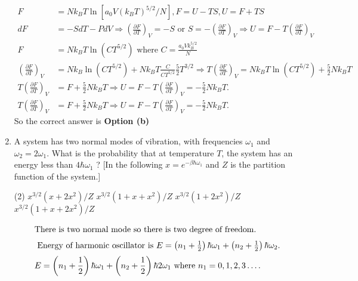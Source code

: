 \begin{enumerate}
\begin{answer}
	\begin{align*}
    F&=N k_{B} T \ln \left[a_{0} V\left(k_{B} T\right)^{5 / 2} / N\right], F=U-T S, U=F+T S\\
	d F&=-S d T-P d V \Rightarrow\left(\frac{\partial F}{\partial T}\right)_{V}=-S \text { or } S=-\left(\frac{\partial F}{\partial T}\right)_{V} \Rightarrow U=F-T\left(\frac{\partial F}{\partial T}\right)_{V} \\
	F&=N k_{B} T \ln \left(C T^{5 / 2}\right) \text { where } C=\frac{a_{0} V k_{B}^{5 / 2}}{N} \\
	\left(\frac{\partial F}{\partial T}\right)_{V}&=N k_{B} \ln \left(C T^{5 / 2}\right)+N k_{B} T \frac{C}{C T^{5 / 2}} \frac{5}{2} T^{3 / 2} \Rightarrow T\left(\frac{\partial F}{\partial T}\right)_{V}=N k_{B} T \ln \left(C T^{5 / 2}\right)+\frac{5}{2} N k_{B} T \\
	T\left(\frac{\partial F}{\partial T}\right)_{V}&=F+\frac{5}{2} N k_{B} T \Rightarrow U=F-T\left(\frac{\partial F}{\partial T}\right)_{V}=-\frac{5}{2} N k_{B} T .\\
	T\left(\frac{\partial F}{\partial T}\right)_{V}&=F+\frac{5}{2} N k_{B} T \Rightarrow U=F-T\left(\frac{\partial F}{\partial T}\right)_{V}=-\frac{5}{2} N k_{B} T .
	\end{align*}
	So the correct answer is \textbf{Option (b)}
\end{answer}
	\item A system has two normal modes of vibration, with frequencies $\omega_{1}$ and $\omega_{2}=2 \omega_{1}$. What is the probability that at temperature $T$, the system has an energy less than $4 \hbar \omega_{1}$ ?
	[In the following $x=e^{-\beta \hbar \omega_{1}}$ and $Z$ is the partition function of the system.]
	 \begin{tasks}(2)
		\task[\textbf{a.}]$x^{3 / 2}\left(x+2 x^{2}\right) / Z$
		\task[\textbf{b.}]$x^{3 / 2}\left(1+x+x^{2}\right) / Z$
		\task[\textbf{c.}]$x^{3 / 2}\left(1+2 x^{2}\right) / Z$
		\task[\textbf{d.}] $x^{3 / 2}\left(1+x+2 x^{2}\right) / Z$
	\end{tasks}
\begin{answer}
	\begin{align*}
	 \intertext{There is two normal mode so there is two degree of freedom.}
\intertext{	Energy of harmonic oscillator is $E=\left(n_{1}+\frac{1}{2}\right) \hbar \omega_{1}+\left(n_{2}+\frac{1}{2}\right) \hbar \omega_{2}$.} E&=\left(n_{1}+\frac{1}{2}\right) \hbar \omega_{1}+\left(n_{2}+\frac{1}{2}\right) \hbar 2 \omega_{1}\text{ where } n_{1}=0,1,2,3 \ldots .

\end{align*}
\end{answer}
\end{enumerate}
